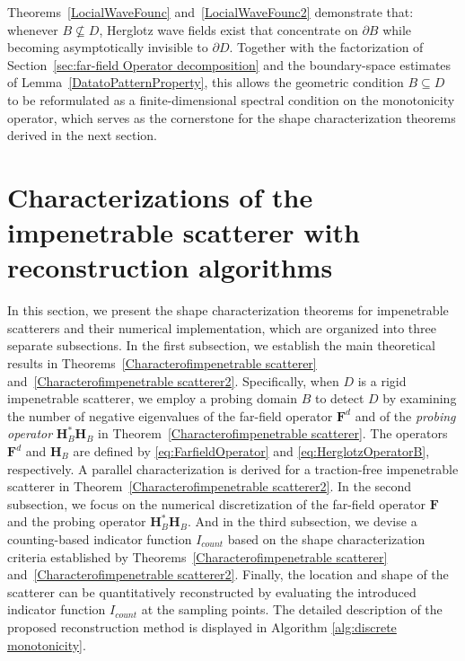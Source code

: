 \documentclass[11pt,reqno,twoside]{amsart}
\theoremstyle{definition}
\theoremstyle{remark}
\numberwithin{equation}{section}
\begin{document}
Theorems~\ref{LocialWaveFounc} and~\ref{LocialWaveFounc2} demonstrate that: whenever $B \not\subseteq D$, Herglotz wave fields exist that concentrate on $\partial B$ while becoming asymptotically invisible to $\partial D$. Together with the factorization of Section~\ref{sec:far-field Operator decomposition} and the boundary-space estimates of Lemma~\ref{DatatoPatternProperty}, this allows the geometric condition \(B \subseteq D\) to be reformulated as a finite-dimensional spectral condition on the monotonicity operator, which serves as the cornerstone for the shape characterization theorems derived in the next section.


\section{Characterizations of the impenetrable scatterer with reconstruction algorithms}\label{sec:Characterization of the impenetrable scatterer}

In this section, we present the shape characterization theorems for impenetrable scatterers and their numerical implementation, which are organized into three separate subsections.
In the first subsection, we establish the main theoretical results in Theorems~\ref{Characterofimpenetrable scatterer} and~\ref{Characterofimpenetrable scatterer2}. Specifically, when $D$ is a rigid impenetrable scatterer, we employ a probing domain $B$ to detect $D$ by examining the number of negative eigenvalues of the far-field operator $\mathbf{F}^d$ and of the \emph{probing operator} $\mathbf{H}_B^* \mathbf{H}_B$ in Theorem~\ref{Characterofimpenetrable scatterer}. The operators $\mathbf{F}^d$ and $\mathbf{H}_B$ are defined by \eqref{eq:FarfieldOperator} and \eqref{eq:HerglotzOperatorB}, respectively. A parallel characterization is derived for a traction-free impenetrable scatterer in Theorem~\ref{Characterofimpenetrable scatterer2}.
In the second subsection, we focus on the numerical discretization of the far-field operator $\mathbf{F}$ and the probing operator $\mathbf{H}_B^* \mathbf{H}_B$. And in 
the third subsection, we devise a counting-based indicator function $I_{{count}}$ based on the shape characterization criteria established by Theorems~\ref{Characterofimpenetrable scatterer} and~\ref{Characterofimpenetrable scatterer2}. Finally, the location and shape of the scatterer can be quantitatively reconstructed by evaluating the introduced indicator function $I_{{count}}$ at the sampling points. The detailed description of the proposed reconstruction method is displayed in Algorithm \ref{alg:discrete monotonicity}.
\end{document}
